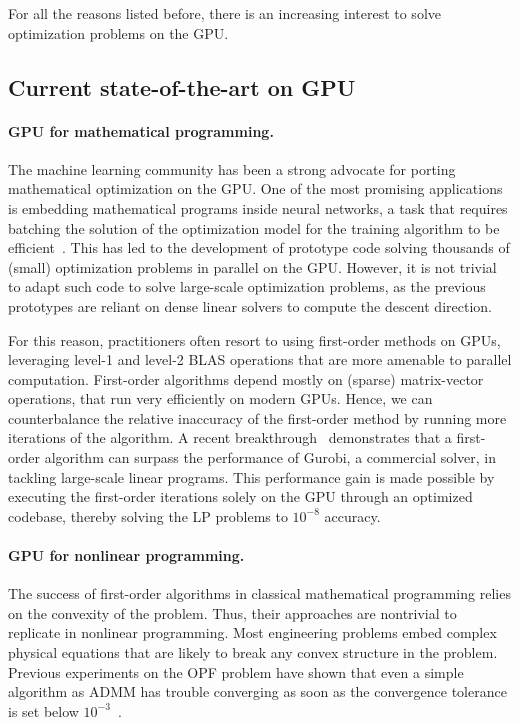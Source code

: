 For all the reasons listed before, there is an increasing interest
to solve optimization problems on the GPU.

\subsection{Current state-of-the-art on GPU}

\paragraph{GPU for mathematical programming.}
The machine learning community has been a strong advocate for porting
mathematical optimization on the GPU. One of the most promising
applications is embedding mathematical programs inside neural networks,
a task that requires batching the solution of the optimization model
for the training algorithm to be
efficient~\cite{amos2017optnet,pineda2022theseus}.  This has led to
the development of prototype code solving thousands of (small)
optimization problems in parallel on the GPU.  However, it is not
trivial to adapt such code to solve large-scale optimization problems,
as the previous prototypes are reliant on dense linear solvers to
compute the descent direction.

For this reason, practitioners often resort to using first-order
methods on GPUs, leveraging level-1 and level-2 BLAS operations that
are more amenable to parallel computation.
First-order algorithms depend mostly on (sparse) matrix-vector operations, that run
very efficiently on modern GPUs. Hence, we can counterbalance
the relative inaccuracy of the first-order method by running more
iterations of the algorithm.
A recent breakthrough~\cite{lu2023cupdlp,lu2023cupdlp2} demonstrates
that a first-order algorithm can surpass the performance of Gurobi, a
commercial solver, in tackling large-scale linear programs. This
performance gain is made possible by executing the first-order
iterations solely on the GPU through an optimized codebase, thereby
solving the LP problems to $10^{-8}$ accuracy.


\paragraph{GPU for nonlinear programming.}
The success of first-order algorithms in classical mathematical programming
relies on the convexity of the problem. Thus, their approaches are nontrivial to replicate
in nonlinear programming. Most engineering problems embed complex
physical equations that are likely to break any convex structure in the problem.
Previous experiments on the OPF problem have shown that even a simple
algorithm as ADMM has trouble converging as soon as the convergence
tolerance is set below $10^{-3}$~\cite{kim2021leveraging}.

